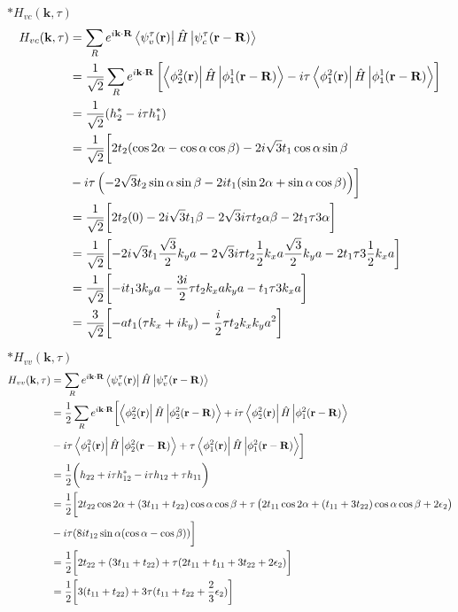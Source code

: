 \documentclass{report}
\newcommand{\f}[2]{\dfrac{#1}{#2}}
\begin{document}
$\ast H_{vc}(\mathbf{k},\tau)$
\begin{align*}
	 H_{vc}(\mathbf{k},\tau) 
	 & = \sum_{R} e^{i\mathbf{k\cdot R}}\bra{\psi_{v}^{\mathfrak{\tau}}(\mathbf{r})}\hat{H}\ket{\mathcal{\psi}_{c}^{\tau}(\mathbf{r - R})}\\
	 & = \f{1}{\sqrt{2}}\sum_{R} e^{i\mathbf{k\cdot R}}\left[ \bra{\phi^2_2(\mathbf{r})} \hat{H} \ket{\phi^1_1(\mathbf{r-R})} - i\tau\bra{\phi^2_1(\mathbf{r})}\hat{H}\ket{\phi^1_1(\mathbf{r-R})} \right] \\
	 & = \f{1}{\sqrt{2}} (h_2^{\ast} - i\tau h_1^{\ast}) \\ 
	 & = \frac{1}{\sqrt{2}} \biggl[ 2t_2 (\cos 2\alpha -\cos\alpha\cos\beta ) - 2i\sqrt{3}t_1\cos\alpha\sin\beta  \\
	 & - i\tau \left(-2\sqrt{3} t_2 \sin\alpha \sin\beta - 2i t_1(\sin2\alpha + \sin\alpha \cos\beta )\right) \biggr] \\
	 & = \f{1}{\sqrt{2}} \biggl[ 2 t_2(0) - 2i\sqrt{3}t_1\beta - 2\sqrt{3}i\tau t_2\alpha\beta  - 2t_1 \tau 3\alpha \biggr] \\
	 & = \f{1}{\sqrt{2}} \biggl[ - 2i\sqrt{3}t_1\f{\sqrt{3}}{2}k_y a - 2\sqrt{3}i\tau t_2\f{1}{2} k_x a\f{\sqrt{3}}{2}k_y a  - 2t_1\tau 3\f{1}{2} k_x a \biggr] \\
	 & = \f{1}{\sqrt{2}} \biggl[ - it_1 3 k_y a - \f{3i}{2} \tau t_2 k_x a k_y a  - t_1\tau 3 k_x a \biggr] \\
	 & = \f{3}{\sqrt{2}} \biggl[ -a t_1 (\tau k_x + ik_y ) - \f{i}{2} \tau t_2 k_x k_y a^2  \biggr] \\
\end{align*}

$\ast H_{vv}(\mathbf{k},\tau)$
\begin{align*}
	 H_{vv}(\mathbf{k},\tau) 
	 & = \sum_{R} e^{i\mathbf{k\cdot R}}\bra{\psi_{v}^{\mathfrak{\tau}}(\mathbf{r})}\hat{H}\ket{\mathcal{\psi}_{v}^{\tau}(\mathbf{r - R})}\\
	 & = \f{1}{2}\sum_{R} e^{i\mathbf{k\cdot R}} \biggl[ \bra{\phi^2_2(\mathbf{r})} \hat{H} \ket{\phi^2_2(\mathbf{r-R})} + i\tau\bra{\phi^2_2(\mathbf{r})}\hat{H}\ket{\phi^2_1(\mathbf{r-R})}\\
	 & - i\tau \bra{\phi^2_1(\mathbf{r})}\hat{H}\ket{\phi^2_2(\mathbf{r-R})} +\tau \bra{\phi^2_1(\mathbf{r})}\hat{H}\ket{\phi^2_1(\mathbf{r-R})} \biggr] \\
	 & = \f{1}{2} \biggl( h_{22} + i\tau h_{12}^{\ast} - i\tau h_{12} + \tau h_{11}   \biggr) \\ 
	 & = \f{1}{2} \biggl[ 2 t_{22} \cos2\alpha  + (3t_{11} + t_{22})\cos\alpha \cos\beta + \tau\left(2t_{11}\cos2\alpha + \left (t_{11} + 3t_{22}\right )\cos\alpha\cos\beta + 2\epsilon_2\right) \\
	 & - i\tau (8i t_{12}\sin\alpha(\cos\alpha - \cos\beta)) \biggr] \\
	 & = \f{1}{2} \biggl[2 t_{22} + (3t_{11} + t_{22}) + \tau (2t_{11} + t_{11} + 3t_{22} + 2\epsilon_2 ) \biggr]\\
	 & = \f{1}{2} \biggl[3(t_{11} + t_{22}) + 3\tau (t_{11}+t_{22} + \f{2}{3}\epsilon_2)\biggr]
\end{align*}
\end{document}
